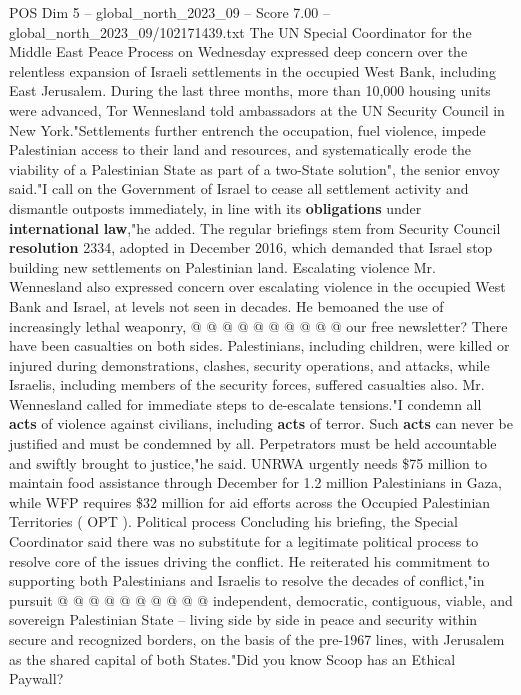 \begin{textsample}{POS Dim 5 – global\_north\_2023\_09 – Score 7.00 – global\_north\_2023\_09/102171439.txt}  \label{ex:f5_pos_440}
The UN Special Coordinator for the Middle East Peace Process on Wednesday expressed deep concern over the relentless expansion of Israeli settlements in the occupied West Bank, including East Jerusalem.
During the last three months, more than 10,000 housing units were advanced, Tor Wennesland told ambassadors at the UN Security Council in New York."Settlements further entrench the occupation, fuel violence, impede Palestinian access to their land and resources, and systematically erode the viability of a Palestinian State as part of a two-State solution", the senior envoy said."I call on the Government of Israel to cease all settlement activity and dismantle outposts immediately, in line with its \textbf{obligations} under \textbf{international} \textbf{law},"he added.
The regular briefings stem from Security Council \textbf{resolution} 2334, adopted in December 2016, which demanded that Israel stop building new settlements on Palestinian land.
Escalating violence Mr.
Wennesland also expressed concern over escalating violence in the occupied West Bank and Israel, at levels not seen in decades.
He bemoaned the use of increasingly lethal weaponry, @ @ @ @ @ @ @ @ @ @ our free newsletter?
There have been casualties on both sides.
Palestinians, including children, were killed or injured during demonstrations, clashes, security operations, and attacks, while Israelis, including members of the security forces, suffered casualties also.
Mr.
Wennesland called for immediate steps to de-escalate tensions."I condemn all \textbf{acts} of violence against civilians, including \textbf{acts} of terror.
Such \textbf{acts} can never be justified and must be condemned by all.
Perpetrators must be held accountable and swiftly brought to justice,"he said.
UNRWA urgently needs \$75 million to maintain food assistance through December for 1.2 million Palestinians in Gaza, while WFP requires \$32 million for aid efforts across the Occupied Palestinian Territories ( OPT ).
Political process Concluding his briefing, the Special Coordinator said there was no substitute for a legitimate political process to resolve core of the issues driving the conflict.
He reiterated his commitment to supporting both Palestinians and Israelis to resolve the decades of conflict,"in pursuit @ @ @ @ @ @ @ @ @ @ independent, democratic, contiguous, viable, and sovereign Palestinian State -- living side by side in peace and security within secure and recognized borders, on the basis of the pre-1967 lines, with Jerusalem as the shared capital of both States."Did you know Scoop has an Ethical Paywall?

\end{textsample}
